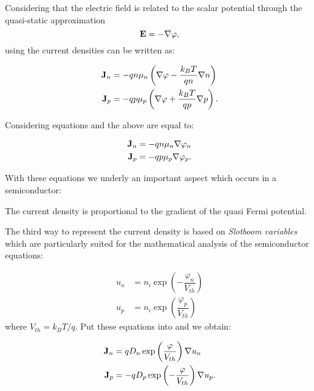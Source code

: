 Considering that the electric field is related to the scalar potential through the quasi-static approximation
\begin{equation}
\label{eq: relazione pot electric}
\mathbf{E}  = -\nabla \varphi ,
\end{equation}
using  the current densities can be written as:

\begin{align}
\mathbf{J}_n &= -qn\mu_n\left(\nabla \varphi - \dfrac{k_BT}{qn}\nabla n \right) \label{eq: Jn DD} \\ 
\mathbf{J}_p &= -qp\mu_p\left(\nabla \varphi+ \dfrac{k_BT}{qp} \nabla p \right). \label{eq: Jp DD}
\end{align}

Considering equations  and  the above are equal to:

\begin{align}
\mathbf{J}_n = -qn\mu_n\nabla \varphi_n \label{eq: Jn qf}\\
\mathbf{J}_p = -qp\mu_p\nabla \varphi_p \label{eq: Jp qf}.
\end{align}

With these equations we underly an important aspect which occurs in a semiconductor:
\begin{Osservazione}
The current density is proportional to the gradient of the quasi Fermi potential.
\end{Osservazione}

The third way to represent the current density is based on \textit{Slotboom variables} which are particularly suited for the mathematical analysis of the semiconductor equations:

\begin{align}
u_n &= n_i\exp\left(-\dfrac{\varphi_n}{V_{th}} \right) \label{eq: un slotboom} \\
u_p &= n_i\exp\left(\dfrac{\varphi_p}{V_{th}} \right) \label{eq: up slotboom} 
\end{align}
where $V_{th}=k_BT/q$. Put these equations into  and  we obtain:

\begin{align}
\mathbf{J}_n &= qD_n \exp\left(\dfrac{\varphi}{V_{th}}\right) \nabla u_n \label{eq: Jn slotboom} \\
\mathbf{J}_p &= -qD_p \exp\left(-\dfrac{\varphi}{V_{th}}\right)  \nabla u_p .\label{eq: Jp slotboom}
\end{align}

